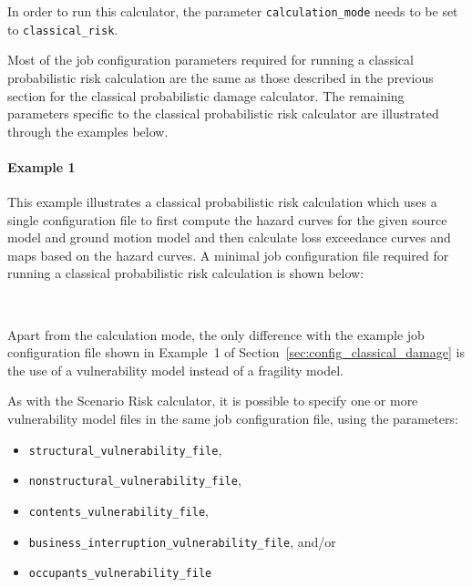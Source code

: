 In order to run this calculator, the parameter \Verb+calculation_mode+ needs
to be set to \Verb+classical_risk+.

Most of the job configuration parameters required for running a classical
probabilistic risk calculation are the same as those described in the previous
section for the classical probabilistic damage calculator. The remaining
parameters specific to the classical probabilistic risk calculator are
illustrated through the examples below.

\paragraph{Example 1}

This example illustrates a classical probabilistic risk calculation which uses
a single configuration file to first compute the hazard curves for the given
source model and ground motion model and then calculate loss exceedance curves
and maps based on the hazard curves. A minimal job configuration file required
for running a classical probabilistic risk calculation is shown below:

\inputminted[firstline=1,firstnumber=1,fontsize=\footnotesize,frame=single,linenos,bgcolor=lightgray,label=job.ini]{ini}{oqum/risk/verbatim/config_classical_risk_combined.ini}\\

Apart from the calculation mode, the only difference with the example job
configuration file shown in Example~1 of
Section~\ref{sec:config_classical_damage} is the use of a vulnerability model
instead of a fragility model.

As with the Scenario Risk calculator, it is possible to specify one or more
vulnerability model files in the same job configuration file, using the
parameters:

\begin{itemize}

  \item \Verb+structural_vulnerability_file+,

  \item \Verb+nonstructural_vulnerability_file+,

  \item \Verb+contents_vulnerability_file+,

  \item \Verb+business_interruption_vulnerability_file+, and/or

  \item \Verb+occupants_vulnerability_file+

\end{itemize}

